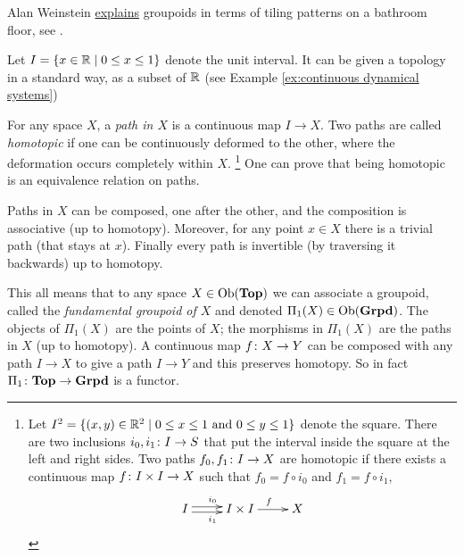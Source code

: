 \documentclass[CT4S-EN-RU]{subfiles}
\begin{document}
\begin{applicationRUS}
\end{applicationRUS}

\begin{exampleENG}
Alan Weinstein \href{http://www.ams.org/notices/199607/weinstein.pdf}{\text explains} groupoids in terms of tiling patterns on a bathroom floor, see \cite{WeA}.
\end{exampleENG}

\begin{exampleRUS}
\end{exampleRUS}

\begin{exampleENG}\label{ex:fundamental groupoid}
Let $I=\{x\in{\mathbb R}{\;|\;}0\leq x\leq 1\}$ denote the unit interval. It can be given a topology in a standard way, as a subset of ${\mathbb R}$ (see Example \ref{ex:continuous dynamical systems})

For any space $X$, a {\em path in $X$} is a continuous map $I\to X$. Two paths are called {\em homotopic} if one can be continuously deformed to the other, where the deformation occurs completely within $X$.
\footnote{
Let $I^2=\{(x,y)\in{\mathbb R}^2{\;|\;}0\leq x\leq 1 \textnormal{ and } 0\leq y\leq 1\}$ denote the square. There are two inclusions $i_0,i_1\colon I\rightarrow S$ that put the interval inside the square at the left and right sides. Two paths $f_0,f_1\colon I\rightarrow X$ are homotopic if there exists a continuous map $f\colon I\times I\rightarrow X$ such that $f_0=f\circ i_0$ and $f_1=f\circ i_1$, 
$$\xymatrix{I\ar@<-.5ex>[r]_{i_1}\ar@<.5ex>[r]^{i_0}&I\times I\ar[r]^f&X}$$
} 
One can prove that being homotopic is an equivalence relation on paths. 

Paths in $X$ can be composed, one after the other, and the composition is associative (up to homotopy). Moreover, for any point $x\in X$ there is a trivial path (that stays at $x$). Finally every path is invertible (by traversing it backwards) up to homotopy. 

This all means that to any space $X\in\textnormal{Ob}({\bf Top})$ we can associate a groupoid, called the {\em fundamental groupoid of $X$} and denoted $\Pi_1(X)\in\textnormal{Ob}({\bf Grpd})$. The objects of $\Pi_1(X)$ are the points of $X$; the morphisms in $\Pi_1(X)$ are the paths in $X$ (up to homotopy). A continuous map $f\colon X\rightarrow Y$ can be composed with any path $I\to X$ to give a path $I\to Y$ and this preserves homotopy. So in fact $\Pi_1\colon{\bf Top}\rightarrow{\bf Grpd}$ is a functor.
\end{exampleENG}
\end{document}
